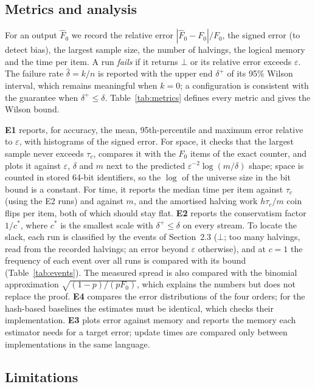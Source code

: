 \documentclass[11pt]{article}
\newcommand{\eps}{\varepsilon}
\newcommand{\Fhat}{\widehat{F}_0}
\newcommand{\dhat}{\widehat{\delta}}
\begin{document}
\subsection{Metrics and analysis}\label{sec:metrics}

For an output $\Fhat$ we record the relative error $|\Fhat - F_0|/F_0$, the
signed error (to detect bias), the largest sample size, the number of
halvings, the logical memory and the time per item. A run \emph{fails} if it
returns $\bot$ or its relative error exceeds $\eps$. The failure rate
$\dhat = k/n$ is reported with the upper end $\delta^+$ of its 95\% Wilson
interval, which remains meaningful when $k = 0$; a configuration is consistent
with the guarantee when $\delta^+ \le \delta$. Table~\ref{tab:metrics} defines
every metric and gives the Wilson bound.

\textbf{E1} reports, for accuracy, the mean, 95th-percentile and maximum error
relative to $\eps$, with histograms of the signed error. For space, it checks
that the largest sample never exceeds $\tau_c$, compares it with the $F_0$
items of the exact counter, and plots it against $\eps$, $\delta$ and $m$ next
to the predicted $\eps^{-2}\log(m/\delta)$ shape; space is counted in stored
64-bit identifiers, so the $\log$ of the universe size in the bit bound is a
constant. For time, it reports the median time per item against $\tau_c$
(using the E2 runs) and against $m$, and the amortised halving work
$h\tau_c/m$ coin flips per item, both of which should stay flat.
\textbf{E2} reports the conservatism factor $1/c^*$, where $c^*$ is the
smallest scale with $\delta^+ \le \delta$ on every stream. To locate the
slack, each run is classified by the events of Section~2.3 ($\bot$; too many
halvings, read from the recorded halvings; an error beyond $\eps$ otherwise),
and at $c = 1$ the frequency of each event over all runs is compared with its
bound (Table~\ref{tab:events}). The measured spread is also compared with the
binomial approximation $\sqrt{(1-p)/(pF_0)}$, which explains the numbers but
does not replace the proof. \textbf{E4} compares the error distributions of
the four orders; for the hash-based baselines the estimates must be identical,
which checks their implementation. \textbf{E3} plots error against memory and
reports the memory each estimator needs for a target error; update times are
compared only between implementations in the same language.

\subsection{Limitations}\label{sec:limitations}
\end{document}
